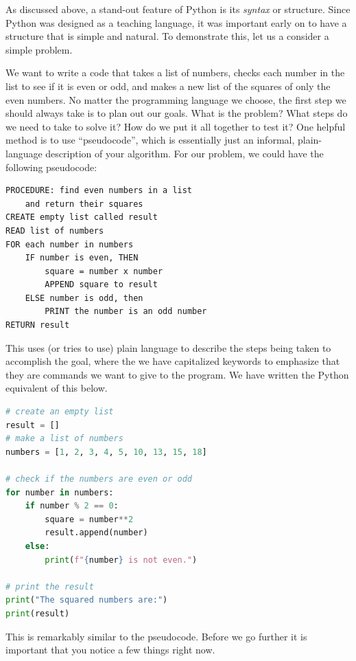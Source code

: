 \documentclass{tufte-book}
\begin{document}


As discussed above, a stand-out feature of Python is its \textit{syntax} or structure. Since Python was designed as a teaching language, it was important early on to have a structure that is simple and natural. To demonstrate this, let us a consider a simple problem. 

We want to write a code that takes a list of numbers, checks each number in the list to see if it is even or odd, and makes a new list of the squares of only the even numbers. No matter the programming language we choose, the first step we should always take is to plan out our goals. What is the problem? What steps do we need to take to solve it? How do we put it all together to test it? One helpful method is to use ``pseudocode'', which is essentially just an informal, plain-language description of your algorithm. For our problem, we could have the following pseudocode:

\begin{lstlisting}[backgroundcolor=\color{lightgray}]
PROCEDURE: find even numbers in a list 
    and return their squares
CREATE empty list called result
READ list of numbers
FOR each number in numbers
    IF number is even, THEN
        square = number x number
        APPEND square to result
    ELSE number is odd, then
        PRINT the number is an odd number
RETURN result
\end{lstlisting}

This uses (or tries to use) plain language to describe the steps being taken to accomplish the goal, where the we have capitalized keywords to emphasize that they are commands we want to give to the program. We have written the Python equivalent of this below. 

\begin{lstlisting}[language=Python, showstringspaces=false,
backgroundcolor=\color{lightgray}]
# create an empty list
result = []
# make a list of numbers
numbers = [1, 2, 3, 4, 5, 10, 13, 15, 18]

# check if the numbers are even or odd
for number in numbers:
    if number % 2 == 0:
        square = number**2
        result.append(number)
    else:
        print(f"{number} is not even.")

# print the result
print("The squared numbers are:")
print(result)
\end{lstlisting}

This is remarkably similar to the pseudocode. Before we go further it is important that you notice a few things right now.
\end{document}
